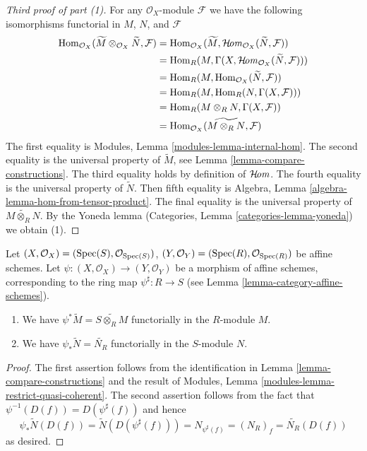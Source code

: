 \begin{proof}[Third proof of part (1)]
For any $\mathcal{O}_X$-module $\mathcal{F}$
we have the following isomorphisms functorial in $M$, $N$, and $\mathcal{F}$
\begin{align*}
\mathop{\mathrm{Hom}}\nolimits_{\mathcal{O}_X}(\widetilde{M} \otimes _{\mathcal{O} _X} \widetilde{N},
\mathcal{F})
& =
\mathop{\mathrm{Hom}}\nolimits_{\mathcal{O}_X}(\widetilde{M},
\mathop{\mathcal{H}\!\mathit{om}}\nolimits_{\mathcal{O} _X} (\widetilde{N}, \mathcal{F})) \\
& =
\mathop{\mathrm{Hom}}\nolimits_R(M, \Gamma(X,
\mathop{\mathcal{H}\!\mathit{om}}\nolimits_{\mathcal{O}_X}(\widetilde{N}, \mathcal{F}))) \\
& =
\mathop{\mathrm{Hom}}\nolimits_R(M, \mathop{\mathrm{Hom}}\nolimits_{\mathcal{O}_X}(\widetilde{N}, \mathcal{F})) \\
& =
\mathop{\mathrm{Hom}}\nolimits_R(M, \mathop{\mathrm{Hom}}\nolimits_R(N, \Gamma(X,\mathcal{F}))) \\
& =
\mathop{\mathrm{Hom}}\nolimits_R(M \otimes_R N, \Gamma(X, \mathcal{F})) \\
& =
\mathop{\mathrm{Hom}}\nolimits_{\mathcal{O}_X}(\widetilde{M \otimes_R N}, \mathcal{F})
\end{align*}
The first equality is Modules, Lemma \ref{modules-lemma-internal-hom}.
The second equality is the universal property of $\widetilde{M}$, see
Lemma \ref{lemma-compare-constructions}. The third equality holds by
definition of $\mathop{\mathcal{H}\!\mathit{om}}\nolimits$. The fourth equality is the universal property
of $\widetilde{N}$. Then fifth equality is
Algebra, Lemma \ref{algebra-lemma-hom-from-tensor-product}.
The final equality is the universal property of
$\widetilde{M \otimes_R N}$.
By the Yoneda lemma (Categories, Lemma \ref{categories-lemma-yoneda})
we obtain (1).
\end{proof}

\begin{lemma}
\label{lemma-widetilde-pullback}
Let
$(X, \mathcal{O}_X) = (\mathop{\mathrm{Spec}}(S), \mathcal{O}_{\mathop{\mathrm{Spec}}(S)})$,
$(Y, \mathcal{O}_Y) = (\mathop{\mathrm{Spec}}(R), \mathcal{O}_{\mathop{\mathrm{Spec}}(R)})$
be affine schemes.
Let $\psi : (X, \mathcal{O}_X) \to (Y, \mathcal{O}_Y)$ be a
morphism of affine schemes, corresponding to the ring map
$\psi^\sharp : R \to S$ (see Lemma \ref{lemma-category-affine-schemes}).
\begin{enumerate}
\item We have $\psi^* \widetilde M = \widetilde{S \otimes_R M}$
functorially in the $R$-module $M$.
\item We have $\psi_* \widetilde N = \widetilde{N_R}$ functorially
in the $S$-module $N$.
\end{enumerate}
\end{lemma}

\begin{proof}
The first assertion follows from the identification in
Lemma \ref{lemma-compare-constructions}
and the result of Modules, Lemma \ref{modules-lemma-restrict-quasi-coherent}.
The second assertion follows from the fact
that $\psi^{-1}(D(f)) = D(\psi^\sharp(f))$ and hence
$$
\psi_* \widetilde N(D(f)) = \widetilde N(D(\psi^\sharp(f))) =
N_{\psi^\sharp(f)} = (N_R)_f = \widetilde{N_R}(D(f))
$$
as desired.
\end{proof}

